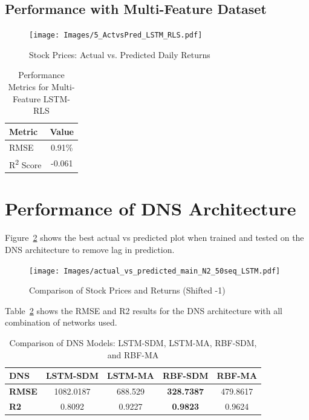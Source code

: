 \subsection{Performance with Multi-Feature Dataset}

\begin{figure}[h!]
    \centering
    \texttt{[image: Images/5\_ActvsPred\_LSTM\_RLS.pdf]}
    \caption{Stock Prices: Actual vs. Predicted Daily Returns}
    \label{fig:actvspred_returns}
\end{figure}

\begin{table}[h!]
\centering
\caption{Performance Metrics for Multi-Feature LSTM-RLS}
\label{tab:performance_metrics}
\begin{tabular}{|l|c|}
\hline
\textbf{Metric}   & \textbf{Value}  \\ \hline
RMSE              & 0.91\%  \\ \hline
R\textsuperscript{2} Score & -0.061  \\ \hline
\end{tabular}
\end{table}

\section{Performance of DNS Architecture}

Figure~\ref{fig:DNSplot} shows the best actual vs predicted plot when trained and tested on the DNS architecture to remove lag in prediction.

\begin{figure}[h!]
    \centering
    \texttt{[image: Images/actual\_vs\_predicted\_main\_N2\_50seq\_LSTM.pdf]}
    \caption{ Comparison of Stock Prices and Returns (Shifted -1)}
    \label{fig:DNSplot}
\end{figure}

Table~\ref{tab:DNSres} shows the RMSE and R2 results for the DNS architecture with all combination of networks used.

\begin{table}[ht]
\centering
\caption{Comparison of DNS Models: LSTM-SDM, LSTM-MA, RBF-SDM, and RBF-MA}
\begin{tabular}{|l|c|c|c|c|}
\hline
\textbf{DNS}     & \textbf{LSTM-SDM} & \textbf{LSTM-MA} & \textbf{RBF-SDM} & \textbf{RBF-MA} \\ \hline
\textbf{RMSE}    & 1082.0187          & 688.529          & \textbf{328.7387}         & 479.8617        \\ \hline
\textbf{R2}      & 0.8092             & 0.9227           & \textbf{0.9823}  & 0.9624          \\ \hline
\end{tabular}

\label{tab:DNSres}
\end{table}


